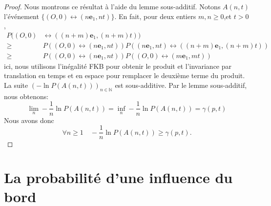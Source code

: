 \documentclass[titlepage,a4paper,12pt]{article}
\newcounter{prop}
\newtheorem{tension}[prop]{Proposition}
\begin{document}
\begin{proof}
Nous montrons ce résultat à l'aide du lemme sous-additif. Notons $A(n,t)$ l'événement $\{(O,0)\longleftrightarrow (n\mathbf{e}_1,nt)\}$. En fait, pour deux entiers $m,n\geqslant 0$,et $t>0$,
\begin{align*}
P((O,0)& \leftrightarrow ((n+m)\mathbf{e}_1,(n+m)t)) \\
\geqslant & P((O,0)\leftrightarrow (n\mathbf{e}_1,nt))P((n\mathbf{e}_1,nt)\leftrightarrow ((n+m)\mathbf{e}_1,(n+m)t))\\
\geqslant & P((O,0)\leftrightarrow (n\mathbf{e}_1,nt))P((O,0)\leftrightarrow (m\mathbf{e}_1,mt))
\end{align*}
ici, nous utilisons l'inégalité FKB \cite{grimmett1999percolation} pour obtenir le produit et l'invariance par translation en temps et en espace pour remplacer le deuxième terme du produit. La suite $(-\ln P(A(n,t)))_{n\in \mathbb{N}}$ est sous-additive. Par le lemme sous-additif, nous obtenons:
$$
\lim_{n}-\frac{1}{n}\ln P(A(n,t)) = \inf_{n} -\frac{1}{n}\ln P(A(n,t)) = \gamma(p,t)
$$
Nous avons donc
$$ \forall n\geqslant 1 \quad -\frac{1}{n}\ln P(A(n,t)) \geqslant \gamma(p,t).
$$
\end{proof}

\begin{comment}
Nous étudions la constante $\gamma(p,t)$ et nous avons la proposition suivante:
\begin{tension}$\frac{\gamma(p,t)}{\gamma(p,0)} \rightarrow 1$ quand $p\rightarrow 1$.
\end{tension}
\begin{proof}
Nous utilisons le fait que $\lim_n \frac{1}{n}\ln P(O\longleftrightarrow n\mathbf{e}_1) = \lim_n \frac{1}{n}\ln P(O\longleftrightarrow \partial \Lambda_n)$ et nous considérons une boîte de taille $n$. Nous remarquons le nombre d'arête qui se ferme entre $[0,t]$ est borné par une loi de Poisson de paramètre $n^2(1-p)t$. Nous notons $N$ le nombre de bout d'un space-time chemin, c'est-à-dire le nombre de chemins fermés tel que $$ (O,0) = (x_1,\theta_1) \longleftrightarrow (x_1,\theta_2) \longleftrightarrow (x_2,\theta_2)\dots \longleftrightarrow (x_N,\theta_N) \longleftrightarrow (\partial\Lambda_n,t).
$$
Nous avons donc $N$ est borné par une variable aléatoire de loi de Poisson de paramètre $n^2(1-p)t$. Quand $p\rightarrow 1$, nous pouvons rendre $N$ d'ordre de 1 avec une probabilité proche de 1 et nous avons le résultat.
\end{proof}
\end{comment}
\section{La probabilité d'une influence du bord}
\end{document}
